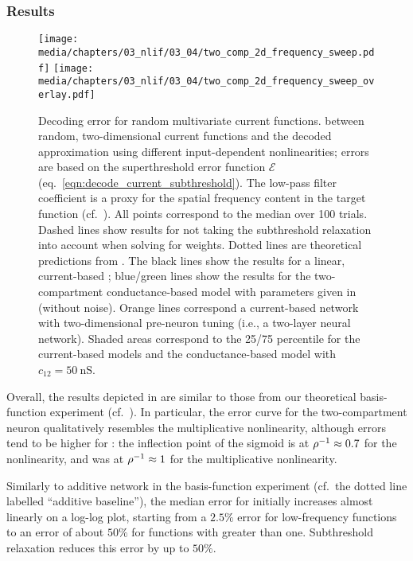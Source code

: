 \subsubsection{Results}

\begin{figure}
	\centering
	\texttt{[image: media/chapters/03\_nlif/03\_04/two\_comp\_2d\_frequency\_sweep.pdf]}%
	\kern-158.06mm\texttt{[image: media/chapters/03\_nlif/03\_04/two\_comp\_2d\_frequency\_sweep\_overlay.pdf]}
	\caption[Two-compartment neuron decoding error for random multivariate current functions]{Decoding error for random multivariate current functions.
	\NRMSE between random, two-dimensional current functions and the decoded approximation using different input-dependent nonlinearities; errors are based on the superthreshold error function $\mathcal{E}$ (eq.~\ref{eqn:decode_current_subthreshold}). The low-pass filter coefficient \slc is a proxy for the spatial frequency content in the target function (cf.~). All points correspond to the median over \num{100} trials. Dashed lines show results for not taking the subthreshold relaxation into account when solving for weights.
	Dotted lines are theoretical predictions from .	
	The black lines show the results for a linear, current-based \Hcur; blue/green lines show the results for the two-compartment conductance-based model  \Hcond with parameters given in  (without noise). Orange lines correspond a current-based network with two-dimensional pre-neuron tuning (i.e., a two-layer neural network). Shaded areas correspond to the 25/75 percentile for the current-based models and the conductance-based model with $c_{12} = \SI{50}{\nano\siemens}$.
	}
	\label{fig:two_comp_lif_frequency_sweep}
\end{figure}

Overall, the results depicted in  are similar to those from our theoretical basis-function experiment  (cf.~).
In particular, the error curve for the two-compartment neuron qualitatively resembles the multiplicative nonlinearity, although errors tend to be higher for \Hcond:
the inflection point of the sigmoid is at ${\rho^{-1}} \approx 0.7$ for the \twocomplif nonlinearity, and was at ${\rho^{-1}} \approx 1$ for the multiplicative nonlinearity.

Similarly to additive network in the basis-function experiment (cf.~the dotted line labelled \enquote{additive baseline}), the median error for \Hcur initially increases almost linearly on a log-log plot, starting from a $2.5\%$ error for low-frequency functions to an error of about $50\%$ for functions with \slc greater than one.
Subthreshold relaxation reduces this error by up to $50\%$.

